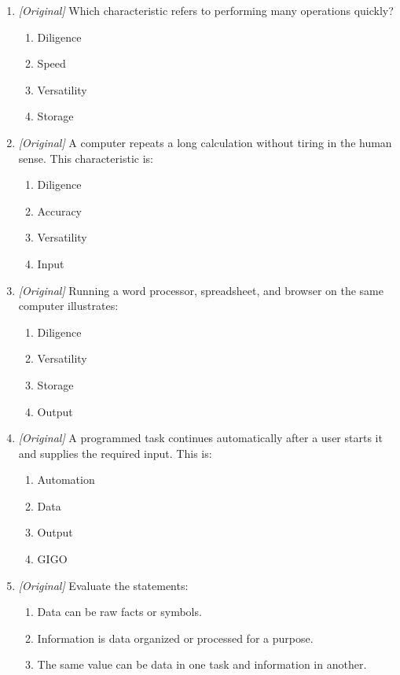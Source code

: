 \begin{enumerate}[label=\textbf{Q\arabic*.}, leftmargin=*]
\begin{enumerate}[label=\Alph*.]
  \end{enumerate}
\item \textit{[Original]} Which characteristic refers to performing many
  operations quickly?
  \begin{enumerate}[label=\Alph*.]
    \item Diligence
    \item Speed
    \item Versatility
    \item Storage
  \end{enumerate}
\item \textit{[Original]} A computer repeats a long calculation without
  tiring in the human sense. This characteristic is:
  \begin{enumerate}[label=\Alph*.]
    \item Diligence
    \item Accuracy
    \item Versatility
    \item Input
  \end{enumerate}
\item \textit{[Original]} Running a word processor, spreadsheet, and browser
  on the same computer illustrates:
  \begin{enumerate}[label=\Alph*.]
    \item Diligence
    \item Versatility
    \item Storage
    \item Output
  \end{enumerate}
\item \textit{[Original]} A programmed task continues automatically after a
  user starts it and supplies the required input. This is:
  \begin{enumerate}[label=\Alph*.]
    \item Automation
    \item Data
    \item Output
    \item GIGO
  \end{enumerate}
\item \textit{[Original]} Evaluate the statements:
  \begin{enumerate}[label=\Roman*.]
    \item Data can be raw facts or symbols.
    \item Information is data organized or processed for a purpose.
    \item The same value can be data in one task and information in another.

\end{enumerate}
\end{enumerate}
